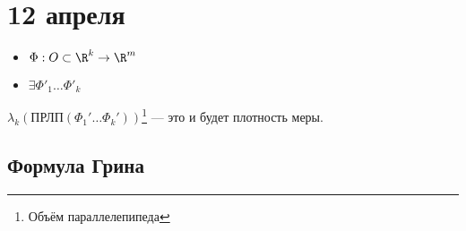 \chapter{12 апреля}


\begin{definition}\itemfix
    \begin{itemize}
        \item \(\Phi : O \subset \R^k \to \R^m\)
        \item \(\exists \Phi'_1 \dots \Phi'_k\)
    \end{itemize}

    \(\lambda_k(\text{ПРЛП}(\Phi_1' \dots \Phi_k'))\)\footnote{Объём параллелепипеда} --- это и будет плотность меры.
\end{definition}

\section{Формула Грина}

